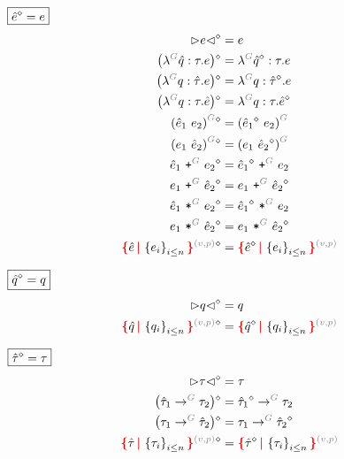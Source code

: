 \noindent $\boxed{\hat{e}\mathclose{}^{\diamond}\mathclose{} = e}$
%
\begin{align*}
  \erase{\cursor{e}} &= e \\
  \erase{\left(\eFun{G}{\Z{q}}{\tau}{e}\right)} &= \eFun{G}{\erase{\Z{q}}}{\tau}{e} \\
  \erase{\left(\eFun{G}{q}{\Z{\tau}}{e}\right)} &= \eFun{G}{q}{\erase{\Z{\tau}}}{e} \\
  \erase{\left(\eFun{G}{q}{\tau}{\Z{e}}\right)} &= \eFun{G}{q}{\tau}{\erase{\Z{e}}} \\
  \erase{\eApp{G}{\Z{e}_1}{e_2}} &= \eApp{G}{\erase{\Z{e}_1}}{e_2} \\
  \erase{\eApp{G}{e_1}{\Z{e}_2}} &= \eApp{G}{e_1}{\erase{\Z{e}_2}} \\
  \erase{\ePlus{G}{\Z{e}_1}{e_2}} &= \ePlus{G}{\erase{\Z{e}_1}}{e_2} \\
  \erase{\ePlus{G}{e_1}{\Z{e}_2}} &= \ePlus{G}{e_1}{\erase{\Z{e}_2}} \\
  \erase{\eTimes{G}{\Z{e}_1}{e_2}} &= \eTimes{G}{\erase{\Z{e}_1}}{e_2} \\
  \erase{\eTimes{G}{e_1}{\Z{e}_2}} &= \eTimes{G}{e_1}{\erase{\Z{e}_2}} \\
  \erase{\conflictHole{\Z{e}, \SetOf{e_i}_{i \leq n}}{v}{p}} &= \conflictHole{\erase{\Z{e}}, \SetOf{e_i}_{i \leq n}}{v}{p}
\end{align*}

\noindent $\boxed{\hat{q}\mathclose{}^{\diamond}\mathclose{} = q}$
%
\begin{align*}
  \erase{\cursor{q}} &= q \\
  \erase{\conflictHole{\Z{q}, \SetOf{q_i}_{i \leq n}}{v}{p}} &= \conflictHole{\erase{\Z{q}}, \SetOf{q_i}_{i \leq n}}{v}{p}
\end{align*}

\noindent $\boxed{\hat{\tau}\mathclose{}^{\diamond}\mathclose{} = \tau}$
%
\begin{align*}
  \erase{\cursor{\tau}} &= \tau \\
  \erase{\left(\tArrow{G}{\Z{\tau}_1}{\tau_2}\right)} &= \tArrow{G}{\erase{\Z{\tau}_1}}{\tau_2} \\
  \erase{\left(\tArrow{G}{\tau_1}{\Z{\tau}_2}\right)} &= \tArrow{G}{\tau_1}{\erase{\Z{\tau}_2}} \\
  \erase{\conflictHole{\Z{\tau}, \SetOf{\tau_i}_{i \leq n}}{v}{p}} &= \conflictHole{\erase{\Z{\tau}}, \SetOf{\tau_i}_{i \leq n}}{v}{p}
\end{align*}


